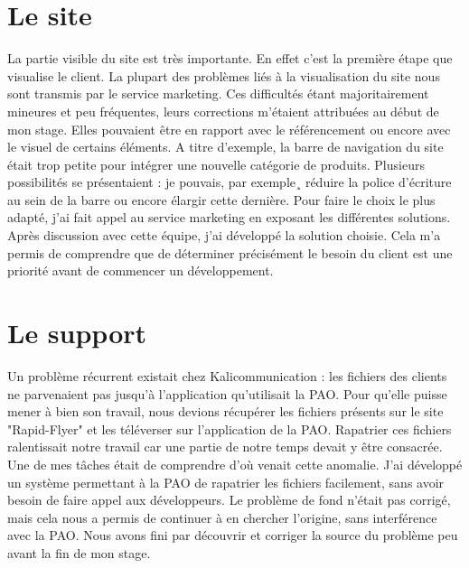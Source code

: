 
\section{Le site}
La partie visible du site est très importante. En effet c'est la première étape que visualise le client. La plupart des problèmes liés à la visualisation du site nous sont transmis par le service marketing. Ces difficultés étant majoritairement mineures et peu fréquentes, leurs corrections m'étaient attribuées au début de mon stage. Elles pouvaient être en rapport avec le référencement ou encore avec le visuel de certains éléments.\newline
A titre d'exemple, la barre de navigation du site était trop petite pour intégrer une nouvelle catégorie de produits. Plusieurs possibilités se présentaient : je pouvais, par exemple¸ réduire la police d'écriture au sein de la barre ou encore élargir cette dernière. Pour faire le choix le plus adapté, j'ai fait appel au service marketing en exposant les différentes solutions. Après discussion avec cette équipe, j'ai développé la solution choisie.\newline
Cela m'a permis de comprendre que de déterminer précisément le besoin du client est une priorité avant de commencer un développement.

\section{Le support}
Un problème récurrent existait chez Kalicommunication : les fichiers des clients ne parvenaient pas jusqu'à l'application qu'utilisait la PAO. Pour qu'elle puisse mener à bien son travail, nous devions récupérer les fichiers présents sur le site "Rapid-Flyer" et les téléverser sur l'application de la PAO.\newline
Rapatrier ces fichiers ralentissait notre travail car une partie de notre temps devait y être consacrée.\newline
Une de mes tâches était de comprendre d'où venait cette anomalie. J'ai développé un système permettant à la PAO de rapatrier les fichiers facilement, sans avoir besoin de faire appel aux développeurs. Le problème de fond n'était pas corrigé, mais cela nous a permis de continuer à en chercher l'origine, sans interférence avec la PAO.\newline
Nous avons fini par découvrir et corriger la source du problème peu avant la fin de mon stage.

